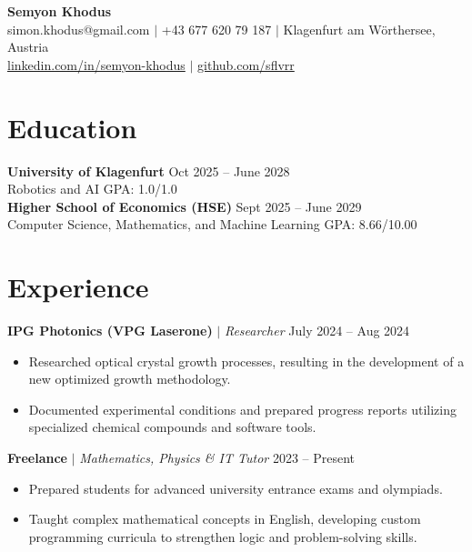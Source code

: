 \documentclass[10pt,a4paper]{article}
\begin{document}
\pagestyle{empty}

\begin{center}
    {\huge \textbf{Semyon Khodus}}\\[0.2cm]
    simon.khodus@gmail.com $|$ +43 677 620 79 187 $|$ Klagenfurt am Wörthersee, Austria\\[0.1cm]
    \href{https://linkedin.com/in/semyon-khodus}{linkedin.com/in/semyon-khodus} $|$ \href{https://github.com/sflvrr}{github.com/sflvrr}
\end{center}

\vspace{0.3cm}

\section{Education}
\noindent
\textbf{University of Klagenfurt} \hfill Oct 2025 -- June 2028\\
Robotics and AI \hfill GPA: 1.0/1.0\\[0.15cm]
\textbf{Higher School of Economics (HSE)} \hfill Sept 2025 -- June 2029\\
Computer Science, Mathematics, and Machine Learning \hfill GPA: 8.66/10.00

\section{Experience}
\noindent
\textbf{IPG Photonics (VPG Laserone)} $|$ \textit{Researcher} \hfill July 2024 -- Aug 2024
\begin{itemize}
    \item Researched optical crystal growth processes, resulting in the development of a new optimized growth methodology.
    \item Documented experimental conditions and prepared progress reports utilizing specialized chemical compounds and software tools.
\end{itemize}

\vspace{0.15cm}
\noindent
\textbf{Freelance} $|$ \textit{Mathematics, Physics \& IT Tutor} \hfill 2023 -- Present
\begin{itemize}
    \item Prepared students for advanced university entrance exams and olympiads.
    \item Taught complex mathematical concepts in English, developing custom programming curricula to strengthen logic and problem-solving skills.
\end{itemize}
\end{document}
